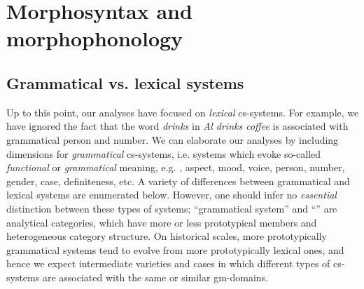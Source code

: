 \section{Morphosyntax and morphophonology}
\rohead{\headmark}
\subsection{Grammatical vs. lexical systems}

Up to this point, our analyses have focused on \textit{lexical} cs-systems. For example, we have ignored the fact that the word \textit{drinks} in \textit{Al drinks coffee} is associated with grammatical person and number. We can elaborate our analyses by including  dimensions for \textit{grammatical} cs-systems, i.e. systems which evoke so-called \textit{functional} or \textit{grammatical} meaning, e.g. , aspect, mood, voice, person, number, gender, case, definiteness, etc. A variety of differences between grammatical and lexical systems are enumerated below. However, one should infer no \textit{essential} distinction between these types of systems; “grammatical system” and “” are analytical categories, which have more or less prototypical members and heterogeneous category structure. On historical scales, more prototypically grammatical systems tend to evolve from more prototypically lexical ones, and hence we expect intermediate varieties and cases in which different types of cs-systems are associated with the same or similar gm-domains. 
